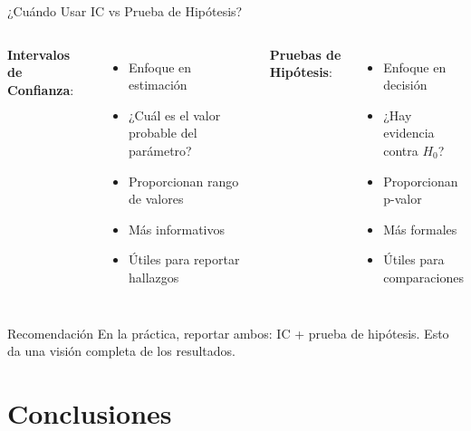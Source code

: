 \documentclass[aspectratio=169, 11pt]{beamer}
\begin{document}
\begin{frame}{¿Cuándo Usar IC vs Prueba de Hipótesis?}
\begin{columns}[T]
\textbf{Intervalos de Confianza}:
\begin{itemize}
  \item Enfoque en \alert{estimación}
  \item ¿Cuál es el valor probable del parámetro?
  \item Proporcionan rango de valores
  \item Más informativos
  \item Útiles para reportar hallazgos
\end{itemize}

\textbf{Pruebas de Hipótesis}:
\begin{itemize}
  \item Enfoque en \alert{decisión}
  \item ¿Hay evidencia contra $H_0$?
  \item Proporcionan p-valor
  \item Más formales
  \item Útiles para comparaciones
\end{itemize}
\end{columns}

\vspace{0.5cm}
\begin{exampleblock}{Recomendación}
En la práctica, \alert{reportar ambos}: IC + prueba de hipótesis. Esto da una visión completa de los resultados.
\end{exampleblock}
\end{frame}

\section{Conclusiones}
\end{document}
